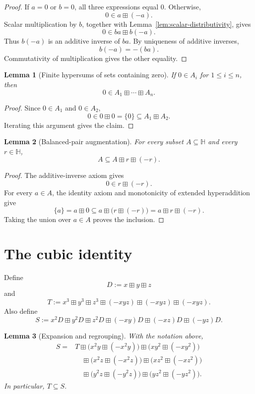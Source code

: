 \documentclass[11pt]{article}
\newtheorem{lemma}{Lemma}
\newcommand{\hplus}{\boxplus}
\begin{document}
\begin{proof}
If \(a=0\) or \(b=0\), all three expressions equal \(0\). Otherwise,
\[
0\in a\hplus(-a).
\]
Scalar multiplication by \(b\), together with
Lemma~\ref{lem:scalar-distributivity}, gives
\[
0\in ba\hplus b(-a).
\]
Thus \(b(-a)\) is an additive inverse of \(ba\). By uniqueness of additive
inverses,
\[
b(-a)=-(ba).
\]
Commutativity of multiplication gives the other equality.
\end{proof}

\begin{lemma}[Finite hypersums of sets containing zero]
\label{lem:zero-in-each}
If \(0\in A_i\) for \(1\leq i\leq n\), then
\[
0\in A_1\hplus\cdots\hplus A_n.
\]
\end{lemma}

\begin{proof}
Since \(0\in A_1\) and \(0\in A_2\),
\[
0\in 0\hplus 0=\{0\}\subseteq A_1\hplus A_2.
\]
Iterating this argument gives the claim.
\end{proof}

\begin{lemma}[Balanced-pair augmentation]
\label{lem:balanced-augmentation}
For every subset \(A\subseteq\mathbb H\) and every \(r\in\mathbb H\),
\[
A\subseteq A\hplus r\hplus(-r).
\]
\end{lemma}

\begin{proof}
The additive-inverse axiom gives
\[
0\in r\hplus(-r).
\]
For every \(a\in A\), the identity axiom and monotonicity of extended
hyperaddition give
\[
\{a\}=a\hplus 0
\subseteq a\hplus\bigl(r\hplus(-r)\bigr)
=a\hplus r\hplus(-r).
\]
Taking the union over \(a\in A\) proves the inclusion.
\end{proof}

\section{The cubic identity}

Define
\[
D:=x\hplus y\hplus z
\]
and
\[
T:=x^3\hplus y^3\hplus z^3
\hplus(-xyz)\hplus(-xyz)\hplus(-xyz).
\]
Also define
\[
S:=x^2D\hplus y^2D\hplus z^2D
\hplus(-xy)D\hplus(-xz)D\hplus(-yz)D.
\]

\begin{lemma}[Expansion and regrouping]
\label{lem:expansion}
With the notation above,
\begin{align*}
S={}&T
\hplus\bigl(x^2y\hplus(-x^2y)\bigr)
\hplus\bigl(xy^2\hplus(-xy^2)\bigr)\\
&\quad
\hplus\bigl(x^2z\hplus(-x^2z)\bigr)
\hplus\bigl(xz^2\hplus(-xz^2)\bigr)\\
&\quad
\hplus\bigl(y^2z\hplus(-y^2z)\bigr)
\hplus\bigl(yz^2\hplus(-yz^2)\bigr).
\end{align*}
In particular, \(T\subseteq S\).
\end{lemma}
\end{document}
